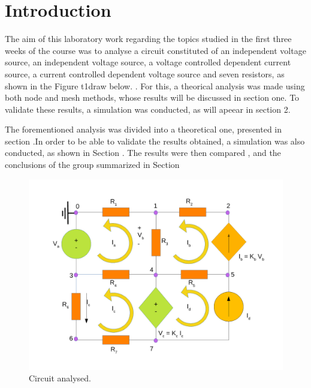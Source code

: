 \section{Introduction}
\label{introduction}

The aim of this laboratory work regarding the topics studied in the first three weeks of the course was to analyse a circuit constituted of an independent voltage source, an independent voltage source, a voltage controlled dependent current source, a current controlled dependent voltage source and seven resistors, as shown in the Figure t1draw below.
. For this, a theorical analysis was made using both node and mesh methods, whose results will be discussed in section one. To validate these results, a simulation was conducted, as will apeear in section 2.


The forementioned analysis was divided into a theoretical one, presented in section .In order to be able to validate the results obtained, a simulation was also conducted, as shown in Section . The results were then compared , and the conclusions of the group summarized in Section 


\begin{figure}[h] \centering
\includegraphics[width=0.9\linewidth]{t1draw.pdf}
\caption{Circuit analysed.}
\label{t1draw}
\end{figure}



